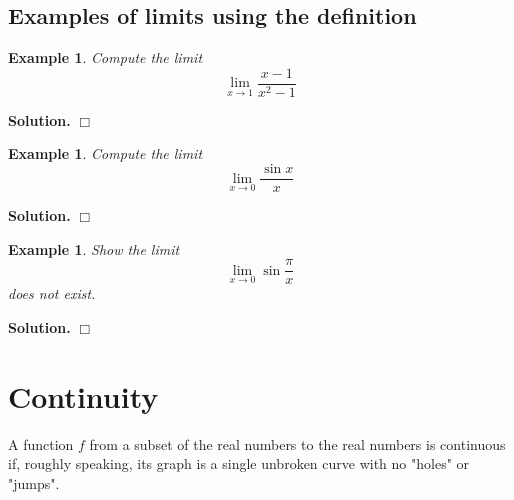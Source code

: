 \documentclass[12pt]{book}
\newenvironment{solution}{\medskip\noindent\textbf{Solution.} }{$\Box$}
\newtheorem{example}[theorem]{Example}
\renewcommand{\optionalDisplay}[1]{}
\begin{document}
\subsection{Examples of limits using the definition}
\begin{example}
Compute the limit
\[\lim\limits_{x\to 1}\frac{x-1}{x^2-1}\]
\end{example}
\begin{solution}
\optionalDisplay{
\psset{xunit=1cm,yunit=1cm}
\begin{pspicture}(-0.5,-0.5)(2,2.5)
\psframe*[linecolor=white](-0.5, -0.5)(2, 2.5)
\tiny
\psaxes[Dy=0.5, labels=none]{<->}(0,0)(-0.5,-0.5)(2,2.5)
\fcYTickWithLabel{0.5}{$0.5$}
\fcXTickWithLabel{1}{$1$}
\psplot[linecolor=red]{-0.5}{2}{1 1 x add div}
\fcHollowDot{1}{0.5}
\end{pspicture}
}%
\end{solution}
\begin{example}
Compute the limit
\[\lim\limits_{x\to 0}\frac{\sin x}{x}\]
\end{example}
\begin{solution}
\optionalDisplay{
\psset{xunit=1cm,yunit=1cm}
\begin{pspicture}(-2,-0.5)(2.2,1.5)
\psframe*[linecolor=white](-2, -0.5)(2.2, 1.7)
\tiny
\fcAxesStandard{-2}{-0.5}{2}{1.5}
\rput[br](-0.1,1.1){ $1$}
\psplot[linecolor=red]{-2}{2}{ x 57.295779513 mul sin x div}
\fcHollowDot{0}{1}
\end{pspicture}
}%
\end{solution}
\begin{example}
Show the limit
\[
\lim\limits_{x\to 0}\sin \frac{\pi}{x}
\]
does not exist.
\end{example}
\begin{solution}
\optionalDisplay{
\begin{pspicture}(-3,-1.5)(3,1.5)
\psframe*[linecolor=white](-3, -1.5)(3.2, 1.7)
\fcAxesStandard{-3}{-1.5}{3}{1.5}
\tiny
\rput[t](1,-0.1){ $1$}
\psplot[linewidth=0.3pt, linecolor=red, plotpoints=10000]{-3}{-0.01}{3.14159 x div 57.295779513 mul sin}
\psplot[linewidth=0.1pt, linecolor=red, plotpoints=10000]{0.01}{3}{3.14159 x div 57.295779513 mul sin}
\end{pspicture}
}%
\end{solution}
\section{Continuity}
A function $f$ from a subset of the real numbers to the real numbers is continuous if, roughly speaking, its graph is a single unbroken curve with no "holes" or "jumps". %
\end{document}
